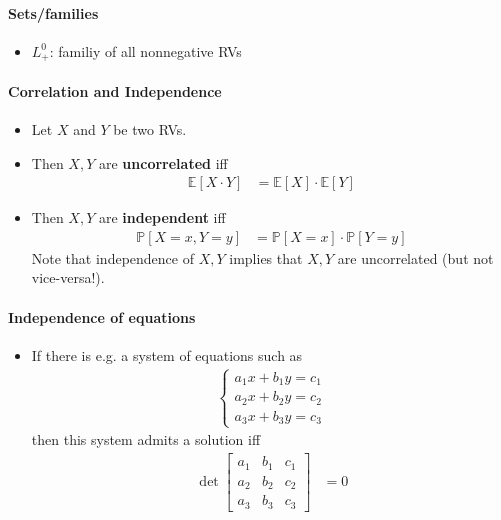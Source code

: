 \documentclass[a4paper,landscape,8pt,fleqn]{scrartcl}
\renewcommand{\emph}[1]{\textbf{#1}}
\begin{document}
\begin{multicols*}{3}
\paragraph{Sets/families}

\begin{itemize}
\item $L_+^0$: familiy of all nonnegative RVs
\end{itemize}

\paragraph{Correlation and Independence}

\begin{itemize}
\item Let $X$ and $Y$ be two RVs.
\item Then $X,Y$ are \emph{uncorrelated} iff
\begin{align*}
\mathbb{E}[X \cdot Y] &= \mathbb{E}[X] \cdot \mathbb{E}[Y]
\end{align*}
\item Then $X,Y$ are \emph{independent} iff
\begin{align*}
\mathbb{P}[X=x,Y=y] &= \mathbb{P}[X=x] \cdot \mathbb{P}[Y=y]
\end{align*}
Note that independence of $X,Y$ implies that $X,Y$ are uncorrelated (but not vice-versa!).
\end{itemize}

\paragraph{Independence of equations}

\begin{itemize}
\item If there is e.g. a system of equations such as
\begin{align*}
\begin{cases}
a_1 x + b_1 y = c_1 \\
a_2 x + b_2 y = c_2 \\
a_3 x + b_3 y = c_3
\end{cases}
\end{align*}
then this system admits a solution iff
\begin{align*}
\det \left[
\begin{matrix}
a_1 & b_1 & c_1 \\
a_2 & b_2 & c_2 \\
a_3 & b_3 & c_3
\end{matrix}
\right] &= 0
\end{align*}
\end{itemize}


\end{multicols*}
\end{document}
